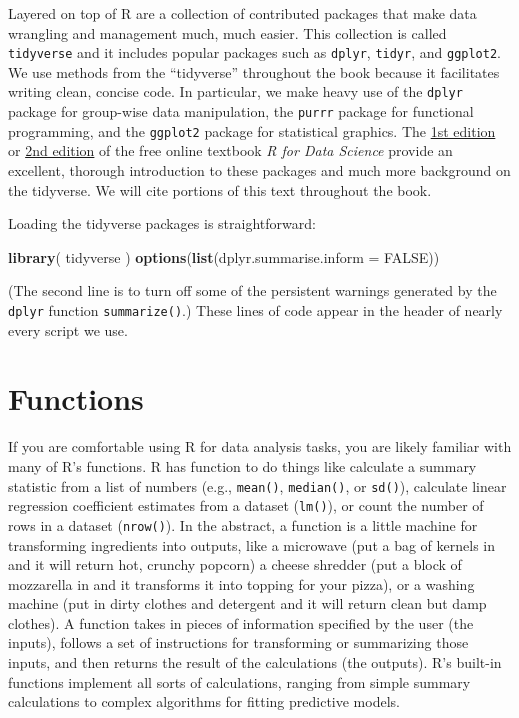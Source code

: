 \documentclass[
]{book}
\newenvironment{Shaded}{\begin{snugshade}}{\end{snugshade}}
\newcommand{\AttributeTok}[1]{\textcolor[rgb]{0.13,0.29,0.53}{#1}}
\newcommand{\ConstantTok}[1]{\textcolor[rgb]{0.56,0.35,0.01}{#1}}
\newcommand{\FunctionTok}[1]{\textcolor[rgb]{0.13,0.29,0.53}{\textbf{#1}}}
\newcommand{\NormalTok}[1]{#1}
\begin{document}
Layered on top of R are a collection of contributed packages that make data wrangling and management much, much easier.
This collection is called \texttt{tidyverse} and it includes popular packages such as \texttt{dplyr}, \texttt{tidyr}, and \texttt{ggplot2}.
We use methods from the ``tidyverse'' throughout the book because it facilitates writing clean, concise code.
In particular, we make heavy use of the \texttt{dplyr} package for group-wise data manipulation, the \texttt{purrr} package for functional programming, and the \texttt{ggplot2} package for statistical graphics.
The \href{https://r4ds.had.co.nz/}{1st edition} or \href{https://r4ds.hadley.nz/}{2nd edition} of the free online textbook \emph{R for Data Science} provide an excellent, thorough introduction to these packages and much more background on the tidyverse.
We will cite portions of this text throughout the book.

Loading the tidyverse packages is straightforward:

\begin{Shaded}
\begin{Highlighting}[]
\FunctionTok{library}\NormalTok{( tidyverse )}
\FunctionTok{options}\NormalTok{(}\FunctionTok{list}\NormalTok{(}\AttributeTok{dplyr.summarise.inform =} \ConstantTok{FALSE}\NormalTok{))}
\end{Highlighting}
\end{Shaded}

(The second line is to turn off some of the persistent warnings generated by the \texttt{dplyr} function \texttt{summarize()}.)
These lines of code appear in the header of nearly every script we use.

\section{Functions}\label{functions}

If you are comfortable using R for data analysis tasks, you are likely familiar with many of R's functions.
R has function to do things like calculate a summary statistic from a list of numbers (e.g., \texttt{mean()}, \texttt{median()}, or \texttt{sd()}), calculate linear regression coefficient estimates from a dataset (\texttt{lm()}), or count the number of rows in a dataset (\texttt{nrow()}).
In the abstract, a function is a little machine for transforming ingredients into outputs, like a microwave (put a bag of kernels in and it will return hot, crunchy popcorn) a cheese shredder (put a block of mozzarella in and it transforms it into topping for your pizza), or a washing machine (put in dirty clothes and detergent and it will return clean but damp clothes).
A function takes in pieces of information specified by the user (the inputs), follows a set of instructions for transforming or summarizing those inputs, and then returns the result of the calculations (the outputs).
R's built-in functions implement all sorts of calculations, ranging from simple summary calculations to complex algorithms for fitting predictive models.
\end{document}
